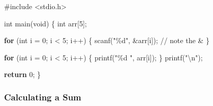 \documentclass[
  letterpaper,
  DIV=11,
  numbers=noendperiod]{scrreprt}
\newenvironment{Shaded}{\begin{snugshade}}{\end{snugshade}}
\newcommand{\CommentTok}[1]{\textcolor[rgb]{0.37,0.37,0.37}{#1}}
\newcommand{\ControlFlowTok}[1]{\textcolor[rgb]{0.00,0.23,0.31}{\textbf{#1}}}
\newcommand{\DataTypeTok}[1]{\textcolor[rgb]{0.68,0.00,0.00}{#1}}
\newcommand{\DecValTok}[1]{\textcolor[rgb]{0.68,0.00,0.00}{#1}}
\newcommand{\ImportTok}[1]{\textcolor[rgb]{0.00,0.46,0.62}{#1}}
\newcommand{\NormalTok}[1]{\textcolor[rgb]{0.00,0.23,0.31}{#1}}
\newcommand{\OperatorTok}[1]{\textcolor[rgb]{0.37,0.37,0.37}{#1}}
\newcommand{\PreprocessorTok}[1]{\textcolor[rgb]{0.68,0.00,0.00}{#1}}
\newcommand{\SpecialCharTok}[1]{\textcolor[rgb]{0.37,0.37,0.37}{#1}}
\newcommand{\StringTok}[1]{\textcolor[rgb]{0.13,0.47,0.30}{#1}}
\begin{document}
\begin{Shaded}
\begin{Highlighting}[]
\PreprocessorTok{\#include }\ImportTok{\textless{}stdio.h\textgreater{}}

\DataTypeTok{int}\NormalTok{ main}\OperatorTok{(}\DataTypeTok{void}\OperatorTok{)} \OperatorTok{\{}
    \DataTypeTok{int}\NormalTok{ arr}\OperatorTok{[}\DecValTok{5}\OperatorTok{];}

    \ControlFlowTok{for} \OperatorTok{(}\DataTypeTok{int}\NormalTok{ i }\OperatorTok{=} \DecValTok{0}\OperatorTok{;}\NormalTok{ i }\OperatorTok{\textless{}} \DecValTok{5}\OperatorTok{;}\NormalTok{ i}\OperatorTok{++)} \OperatorTok{\{}
\NormalTok{        scanf}\OperatorTok{(}\StringTok{"}\SpecialCharTok{\%d}\StringTok{"}\OperatorTok{,} \OperatorTok{\&}\NormalTok{arr}\OperatorTok{[}\NormalTok{i}\OperatorTok{]);}  \CommentTok{// note the \&}
    \OperatorTok{\}}

    \ControlFlowTok{for} \OperatorTok{(}\DataTypeTok{int}\NormalTok{ i }\OperatorTok{=} \DecValTok{0}\OperatorTok{;}\NormalTok{ i }\OperatorTok{\textless{}} \DecValTok{5}\OperatorTok{;}\NormalTok{ i}\OperatorTok{++)} \OperatorTok{\{}
\NormalTok{        printf}\OperatorTok{(}\StringTok{"}\SpecialCharTok{\%d}\StringTok{ "}\OperatorTok{,}\NormalTok{ arr}\OperatorTok{[}\NormalTok{i}\OperatorTok{]);}
    \OperatorTok{\}}
\NormalTok{    printf}\OperatorTok{(}\StringTok{"}\SpecialCharTok{\textbackslash{}n}\StringTok{"}\OperatorTok{);}

    \ControlFlowTok{return} \DecValTok{0}\OperatorTok{;}
\OperatorTok{\}}
\end{Highlighting}
\end{Shaded}

\subsubsection{Calculating a Sum}\label{calculating-a-sum}
\end{document}
